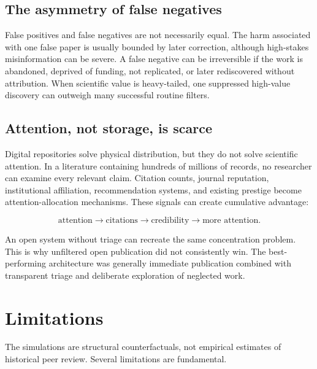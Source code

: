 \subsection{The asymmetry of false negatives}

False positives and false negatives are not necessarily equal. The harm associated with one false paper is usually bounded by later correction, although high-stakes misinformation can be severe. A false negative can be irreversible if the work is abandoned, deprived of funding, not replicated, or later rediscovered without attribution. When scientific value is heavy-tailed, one suppressed high-value discovery can outweigh many successful routine filters.

\subsection{Attention, not storage, is scarce}

Digital repositories solve physical distribution, but they do not solve scientific attention. In a literature containing hundreds of millions of records, no researcher can examine every relevant claim. Citation counts, journal reputation, institutional affiliation, recommendation systems, and existing prestige become attention-allocation mechanisms. These signals can create cumulative advantage:

\begin{equation}
\text{attention}\rightarrow\text{citations}\rightarrow\text{credibility}
\rightarrow\text{more attention}.
\end{equation}

An open system without triage can recreate the same concentration problem. This is why unfiltered open publication did not consistently win. The best-performing architecture was generally immediate publication combined with transparent triage and deliberate exploration of neglected work.

\section{Limitations}

The simulations are structural counterfactuals, not empirical estimates of historical peer review. Several limitations are fundamental.

